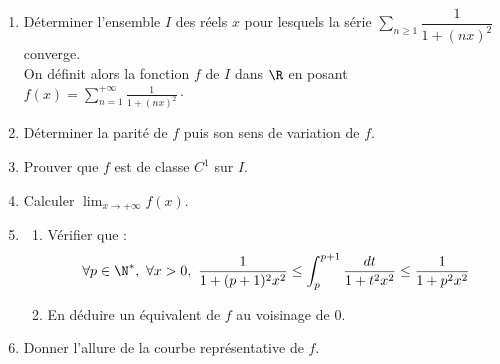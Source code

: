 \documentclass[a4paper,twoside,french,11pt]{VcCours}
\newcommand{\Sum}[2]{\sum_{#1}^{#2}}
\begin{document}
\begin{Exercice}{} \begin{enumerate}
\item Déterminer l'ensemble $I$ des réels $x$ pour lesquels la série $\Sum{n\geq 1}{} \dfrac{1}{1+(nx)^2}$ converge.\\
On définit alors la fonction $f$ de $I$ dans $\R$ en posant $f(x)=\sum_{n=1}^{+\infty}\frac{1}{1+(nx)^2}\cdot$
\item Déterminer la parité de $f$ puis son sens de variation de $f$. 
\item Prouver que $f$ est de classe $C^1$ sur $I$.
\item Calculer $\lim_{x\to +\infty}f(x)$.
\item
\begin{enumerate}
\item Vérifier que :
\[\forall p\in \N^*,\ \forall x >0,\ \frac{1}{1+(p+1)^2x^2}\leq \int_p^{p+1}\frac{dt}{1+t^2x^2}\leq \frac{1}{1+p^2x^2}\] 
\item En déduire un équivalent de $f$ au voisinage de $0$.
\end{enumerate}
\item Donner l'allure de la courbe représentative de $f$.
\end{enumerate}
\end{Exercice}
\end{document}
